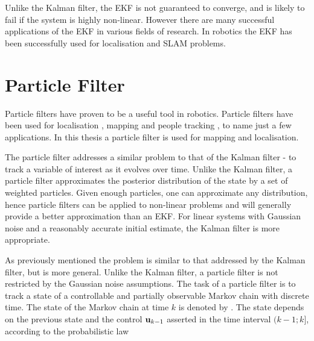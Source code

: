 
Unlike the Kalman filter, the EKF is not guaranteed to converge, and
is likely to fail if the system is highly non-linear. However there
are many successful applications of the EKF in various fields of
research. In robotics the EKF has been successfully used for
localisation \cite{Jensfelt99} and SLAM \cite{dissanayake01,
  bosse03atlas,guivant00:_auton_navig_map_using_laser} problems.


\section{Particle Filter}
\label{sec:PF}

Particle filters have proven to be a useful tool in robotics. Particle
filters have been used for localisation \cite{Thrun00j,thrun00}, mapping
\cite{fastslam} and people tracking
\cite{sidenbladh00stochastic}, to name just a few applications. 
In this thesis a particle filter is used for mapping and localisation.

The particle filter addresses a similar problem to that of the Kalman
filter - to track a variable of interest as it evolves over
time. Unlike the Kalman filter, a particle filter approximates the
posterior distribution of the state by a set of weighted
particles. Given enough particles, one can approximate any
distribution, hence particle filters can be applied to non-linear
problems and will generally provide a better approximation than an
EKF. For linear systems with Gaussian noise and a reasonably accurate
initial estimate, the Kalman filter is more appropriate.

As previously mentioned the problem is similar to that addressed by
the Kalman filter, but is more general. Unlike the Kalman filter, a
particle filter is not restricted by the Gaussian noise
assumptions. The task of a particle filter is to track a state of a
controllable and partially observable Markov chain with discrete
time. The state of the Markov chain at time $k$ is denoted by
. The state depends on the previous state
 and the control ${\bf u}_{k-1}$ asserted in the time interval
$(k-1;k]$, according to the probabilistic law

